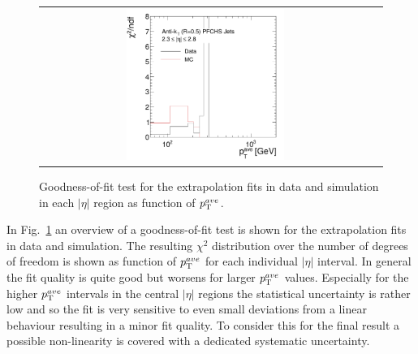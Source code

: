 \begin{figure}[!htp]
\begin{tabular}{cc}
                \includegraphics[width=0.49\textwidth]{figures/GoodnessOfFit_Eta4_final_nominal_v4.pdf}
  \end{tabular}
  \caption{Goodness-of-fit test for the extrapolation fits in data and simulation in each $|\eta|$ region as function of $p_{\text{T}}^{ave}$.}
  \label{fig:goodness-of-fit}
\end{figure}

In Fig.~\ref{fig:goodness-of-fit} an overview of a goodness-of-fit test is shown for the extrapolation fits in data and simulation. The resulting $\chi^2$ distribution over the number of degrees of freedom is shown as function of $p_{\text{T}}^{ave}$ for each individual $|\eta|$ interval. In general the fit quality is quite good but worsens for larger $p_{\text{T}}^{ave}$ values. Especially for the higher $p_{\text{T}}^{ave}$ intervals in the central $|\eta|$ regions the statistical uncertainty is rather low and so the fit is very sensitive to even small deviations from a linear behaviour resulting in a minor fit quality. To consider this for the final result a possible non-linearity is covered with a dedicated systematic uncertainty.

